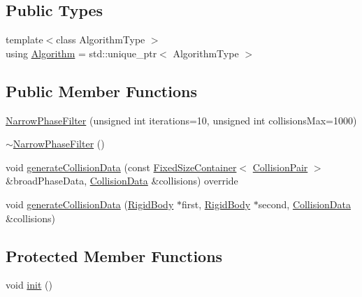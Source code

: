 \subsection*{Public Types}
\begin{DoxyCompactItemize}
\item 
{\footnotesize template$<$class Algorithm\+Type $>$ }\\using \mbox{\hyperlink{classr3_1_1_narrow_phase_filter_aebe310c944167ad73abf098ccc68ed88}{Algorithm}} = std\+::unique\+\_\+ptr$<$ Algorithm\+Type $>$
\end{DoxyCompactItemize}
\subsection*{Public Member Functions}
\begin{DoxyCompactItemize}
\item 
\mbox{\hyperlink{classr3_1_1_narrow_phase_filter_ad3696d7d4a1d0cfd1b383802a4504897}{Narrow\+Phase\+Filter}} (unsigned int iterations=10, unsigned int collisions\+Max=1000)
\item 
\mbox{\hyperlink{classr3_1_1_narrow_phase_filter_acd99c99da07750756ae37fa5641136cb}{$\sim$\+Narrow\+Phase\+Filter}} ()
\item 
void \mbox{\hyperlink{classr3_1_1_narrow_phase_filter_a7f7b7a901d5af6e616bc6df677fae086}{generate\+Collision\+Data}} (const \mbox{\hyperlink{classr3_1_1_fixed_size_container}{Fixed\+Size\+Container}}$<$ \mbox{\hyperlink{classr3_1_1_collision_pair}{Collision\+Pair}} $>$ \&broad\+Phase\+Data, \mbox{\hyperlink{classr3_1_1_collision_data}{Collision\+Data}} \&collisions) override
\item 
void \mbox{\hyperlink{classr3_1_1_narrow_phase_filter_a567743be66c7e8d118165ec92ed68cdf}{generate\+Collision\+Data}} (\mbox{\hyperlink{classr3_1_1_rigid_body}{Rigid\+Body}} $\ast$first, \mbox{\hyperlink{classr3_1_1_rigid_body}{Rigid\+Body}} $\ast$second, \mbox{\hyperlink{classr3_1_1_collision_data}{Collision\+Data}} \&collisions)
\end{DoxyCompactItemize}
\subsection*{Protected Member Functions}
\begin{DoxyCompactItemize}
\item 
void \mbox{\hyperlink{classr3_1_1_narrow_phase_filter_a09742dd02960fab328444144fb22b85b}{init}} ()
\end{DoxyCompactItemize}
